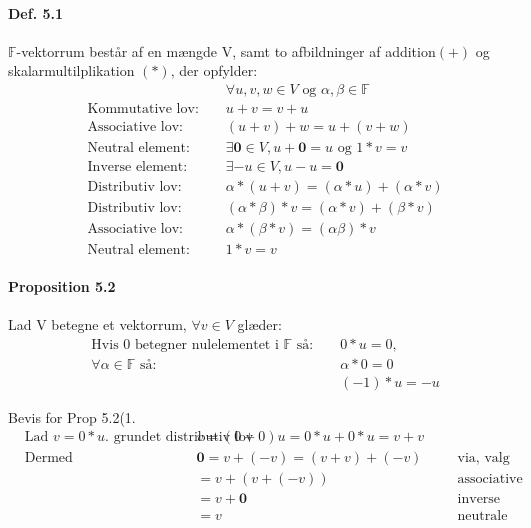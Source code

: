 \documentclass[paper=a4, fontsize=11pt]{scrartcl} %
\begin{document}
	\paragraph{Def. 5.1} $\mathbb{F}$-vektorrum består af en mængde V, samt to afbildninger af addition$(+)$ og skalarmultilplikation $(*)$, der opfylder:
	\begin{align}
		\nonumber & &&\forall u,v,w\in V \text{ og } \alpha,\beta\in \mathbb{F} \\
		&\text{Kommutative lov: }&& u+v=v+u \\
		&\text{Associative lov: }&& (u+v)+w=u+(v+w) \\
		&\text{Neutral element: }&& \exists\mathbf{0}\in V, u+\mathbf{0}=u \text{ og } 1*v = v\\
		&\text{Inverse element: }&& \exists-u\in V, u-u=\mathbf{0}\\
		&\text{Distributiv lov: }&& \alpha*(u+v)=(\alpha*u)+(\alpha*v) \\
		&\text{Distributiv lov: }&& (\alpha*\beta)*v=(\alpha*v)+(\beta*v)\\
		&\text{Associative lov:}&& \alpha*(\beta*v)=(\alpha\beta)*v \\
		&\text{Neutral element: }&& 1*v=v
	\end{align}
	
	\paragraph{Proposition 5.2} Lad V betegne et vektorrum, $\forall v \in V$ glæder:
	\setcounter{equation}{0}
	\begin{align}
		&\text{Hvis 0 betegner nulelementet i }\mathbb{F} \text{ så: }&& 0*u=0,  \\
		&\forall\alpha\in \mathbb{F} \text{ så: }&& \alpha*0=0 \\
		& && (-1)*u=-u
	\end{align}
	
	Bevis for Prop 5.2(1.
	\begin{align*}
		&\text{Lad $v = 0*u$. grundet distributiv lov så: }&& v=(0+0)u=0*u+0*u=v+v &&&\\
		&\text{Dermed}&& \mathbf{0}=v+(-v)=(v+v)+(-v) &&&\text{via, valg af v} \\
		& && =v+(v+(-v)) &&& \text{associative lov}\\
		& &&  =v+\mathbf{0} &&& \text{inverse element} \\
		& && =v &&& \text{neutrale element}
	\end{align*}
	
\end{document}
